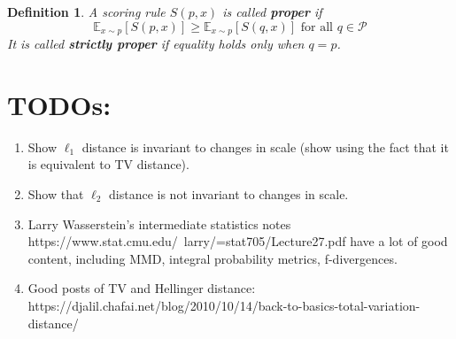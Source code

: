\documentclass[12pt]{article}
\newcommand{\E}{\mathbb{E}}
\newtheorem{definition}{Definition}
\begin{document}
\begin{definition}
A scoring rule $S(p, x)$ is called \textbf{proper} if 
\[\E_{x \sim p}\left[S(p, x) \right] \geq \E_{x \sim p}\left[S(q, x) \right] \text{ for all } q  \in \mathcal{P}\]
It is called \textbf{strictly proper} if equality holds only when $q = p$. 
\end{definition}



\section{TODOs:}
\begin{enumerate}
\item Show $\ell_1$ distance is invariant to changes in scale (show using the fact that it is equivalent to TV distance). 
\item Show that $\ell_2$ distance is not invariant to changes in scale. 
\item Larry Wasserstein's intermediate statistics notes https://www.stat.cmu.edu/~larry/=stat705/Lecture27.pdf have a lot of good content, including MMD, integral probability metrics, f-divergences. 
\item Good posts of TV and Hellinger distance: https://djalil.chafai.net/blog/2010/10/14/back-to-basics-total-variation-distance/
\end{enumerate}
\end{document}
